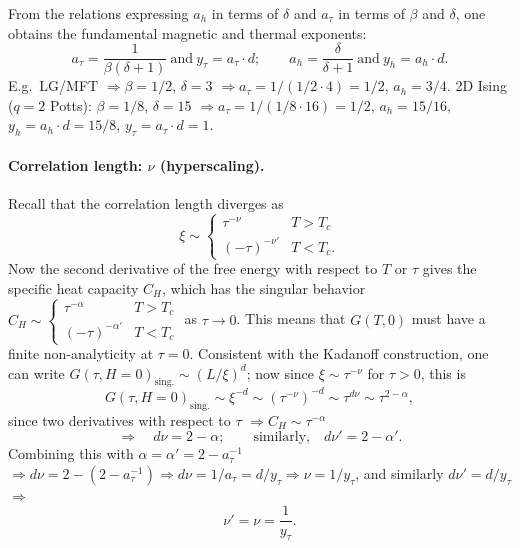 From the relations expressing $a_h$ in terms of $\delta$ and $a_\tau$ in terms of $\beta$ and $\delta$, one
obtains the fundamental magnetic and thermal exponents:
\begin{equation}
  a_\tau = \frac{1}{\beta(\delta+1)}\ \text{and}\ y_\tau = a_\tau\cdot d;\qquad
  a_h = \frac{\delta}{\delta+1}\ \text{and}\ y_h = a_h\cdot d .
\end{equation}
E.g.\ LG/MFT $\Rightarrow\beta = 1/2$, $\delta = 3$ $\Rightarrow a_\tau = 1/(1/2\cdot 4) = 1/2$,
$a_h = 3/4$. 2D Ising ($q = 2$ Potts): $\beta = 1/8$, $\delta = 15$ $\Rightarrow
a_\tau = 1/(1/8\cdot 16) = 1/2$, $a_h = 15/16$, $y_h = a_h\cdot d = 15/8$,
$y_\tau = a_\tau\cdot d = 1$.

\paragraph{Correlation length: $\nu$ (hyperscaling).} Recall that the correlation length diverges as
\begin{equation}
  \xi\sim\begin{cases}\tau^{-\nu} & T>T_c\\ (-\tau)^{-\nu'} & T<T_c .\end{cases}
\end{equation}
Now the second derivative of the free energy with respect to $T$ or $\tau$ gives the specific heat
capacity $C_H$, which has the singular behavior
$C_H\sim\begin{cases}\tau^{-\alpha} & T>T_c\\ (-\tau)^{-\alpha'} & T<T_c\end{cases}$ as $\tau\to 0$. This
means that $G(T,0)$ must have a finite non-analyticity at $\tau = 0$. Consistent with the Kadanoff
construction, one can write $G(\tau,H=0)_{\text{sing.}}\sim(L/\xi)^d$; now since $\xi\sim\tau^{-\nu}$ for
$\tau>0$, this is
\begin{equation}
  G(\tau,H=0)_{\text{sing.}}\sim\xi^{-d}\sim(\tau^{-\nu})^{-d}\sim\tau^{d\nu}\sim\tau^{2-\alpha},
\end{equation}
since two derivatives with respect to $\tau$ $\Rightarrow C_H\sim\tau^{-\alpha}$
\begin{equation}
  \Rightarrow\quad\boxed{d\nu = 2-\alpha};\qquad\text{similarly,}\quad\boxed{d\nu' = 2-\alpha'}.
\end{equation}
Combining this with $\alpha = \alpha' = 2-a_\tau^{-1}$ $\Rightarrow d\nu = 2-(2-a_\tau^{-1})\Rightarrow
d\nu = 1/a_\tau = d/y_\tau\Rightarrow\nu = 1/y_\tau$, and similarly
$d\nu' = d/y_\tau$ $\Rightarrow$
\begin{equation}
  \boxed{\nu' = \nu = \frac{1}{y_\tau}}.
\end{equation}


